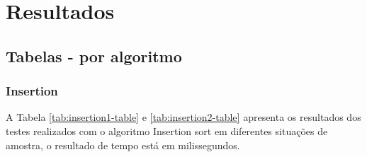 \documentclass[a4paper, 12pt]{article}
\begin{document}
	\section{Resultados}
		\subsection{Tabelas - por algoritmo}


		
\subsubsection{Insertion}
A Tabela \ref{tab:insertion1-table} e \ref{tab:insertion2-table}  apresenta os resultados dos testes realizados com o algoritmo Insertion sort em diferentes situações de amostra, o resultado de tempo está em milissegundos.
\end{document}
